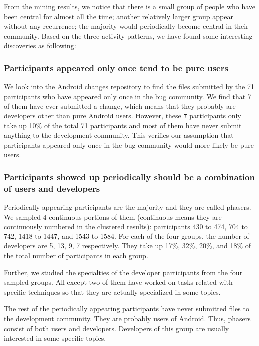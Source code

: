 \documentclass[10pt, conference, compsocconf]{IEEEtran}
\begin{document}
From the mining results, we notice that there is a small group of people who have been central for almost all the time; another relatively larger group appear without any recurrence; the majority would periodically become central in their community. Based on the three activity patterns, we have found some interesting discoveries as following:

\subsubsection{Participants appeared only once tend to be pure users}
We look into the Android changes repository to find the files submitted by the 71 participants who have appeared only once in the bug community. We find that 7 of them have ever submitted a change, which means that they probably are developers other than pure Android users. However, these 7 participants only take up 10\% of the total 71 participants and most of them have never submit anything to the development community. This verifies our assumption that participants appeared only once in the bug community would more likely be pure users.

\subsubsection{Participants showed up periodically should be a combination of users and developers}
Periodically appearing participants are the majority and they are called phasers. We sampled 4 continuous portions of them (continuous means they are continuously numbered in the clustered results): participants 430 to 474, 704 to 742, 1418 to 1447, and 1543 to 1584. For each of the four groups, the number of developers are 5, 13, 9, 7 respectively. They take up 17\%, 32\%, 20\%, and 18\% of the total number of participants in each group. 

Further, we studied the specialties of the developer participants from the four sampled groups. All except two of them have worked on tasks related with specific techniques so that they are actually specialized in some topics. 

The rest of the periodically appearing participants have never submitted files to the development community. They are probably users of Android. Thus, phasers consist of both users and developers. Developers of this group are usually interested in some specific topics.
\end{document}
